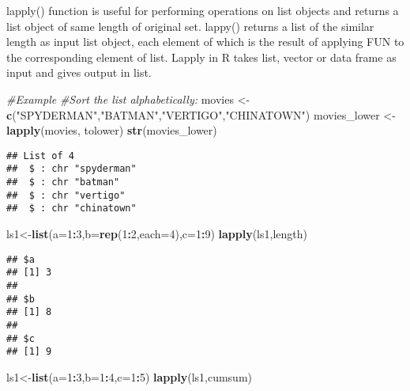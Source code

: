 \documentclass[
]{article}
\newenvironment{Shaded}{\begin{snugshade}}{\end{snugshade}}
\newcommand{\AttributeTok}[1]{\textcolor[rgb]{0.13,0.29,0.53}{#1}}
\newcommand{\CommentTok}[1]{\textcolor[rgb]{0.56,0.35,0.01}{\textit{#1}}}
\newcommand{\DecValTok}[1]{\textcolor[rgb]{0.00,0.00,0.81}{#1}}
\newcommand{\FunctionTok}[1]{\textcolor[rgb]{0.13,0.29,0.53}{\textbf{#1}}}
\newcommand{\NormalTok}[1]{#1}
\newcommand{\OtherTok}[1]{\textcolor[rgb]{0.56,0.35,0.01}{#1}}
\newcommand{\SpecialCharTok}[1]{\textcolor[rgb]{0.81,0.36,0.00}{\textbf{#1}}}
\newcommand{\StringTok}[1]{\textcolor[rgb]{0.31,0.60,0.02}{#1}}
\begin{document}
lapply() function is useful for performing operations on list objects
and returns a list object of same length of original set. lappy()
returns a list of the similar length as input list object, each element
of which is the result of applying FUN to the corresponding element of
list. Lapply in R takes list, vector or data frame as input and gives
output in list.

\begin{Shaded}
\begin{Highlighting}[]
\CommentTok{\#Example}
\CommentTok{\#Sort the list alphabetically:}
\NormalTok{movies }\OtherTok{\textless{}{-}} \FunctionTok{c}\NormalTok{(}\StringTok{"SPYDERMAN"}\NormalTok{,}\StringTok{"BATMAN"}\NormalTok{,}\StringTok{"VERTIGO"}\NormalTok{,}\StringTok{"CHINATOWN"}\NormalTok{)}
\NormalTok{movies\_lower }\OtherTok{\textless{}{-}}\FunctionTok{lapply}\NormalTok{(movies, tolower)}
\FunctionTok{str}\NormalTok{(movies\_lower)}
\end{Highlighting}
\end{Shaded}

\begin{verbatim}
## List of 4
##  $ : chr "spyderman"
##  $ : chr "batman"
##  $ : chr "vertigo"
##  $ : chr "chinatown"
\end{verbatim}

\begin{Shaded}
\begin{Highlighting}[]
\NormalTok{ls1}\OtherTok{\textless{}{-}}\FunctionTok{list}\NormalTok{(}\AttributeTok{a=}\DecValTok{1}\SpecialCharTok{:}\DecValTok{3}\NormalTok{,}\AttributeTok{b=}\FunctionTok{rep}\NormalTok{(}\DecValTok{1}\SpecialCharTok{:}\DecValTok{2}\NormalTok{,}\AttributeTok{each=}\DecValTok{4}\NormalTok{),}\AttributeTok{c=}\DecValTok{1}\SpecialCharTok{:}\DecValTok{9}\NormalTok{)}
\FunctionTok{lapply}\NormalTok{(ls1,length)}
\end{Highlighting}
\end{Shaded}

\begin{verbatim}
## $a
## [1] 3
## 
## $b
## [1] 8
## 
## $c
## [1] 9
\end{verbatim}

\begin{Shaded}
\begin{Highlighting}[]
\NormalTok{ls1}\OtherTok{\textless{}{-}}\FunctionTok{list}\NormalTok{(}\AttributeTok{a=}\DecValTok{1}\SpecialCharTok{:}\DecValTok{3}\NormalTok{,}\AttributeTok{b=}\DecValTok{1}\SpecialCharTok{:}\DecValTok{4}\NormalTok{,}\AttributeTok{c=}\DecValTok{1}\SpecialCharTok{:}\DecValTok{5}\NormalTok{)}
\FunctionTok{lapply}\NormalTok{(ls1,cumsum)}
\end{Highlighting}
\end{Shaded}
\end{document}
